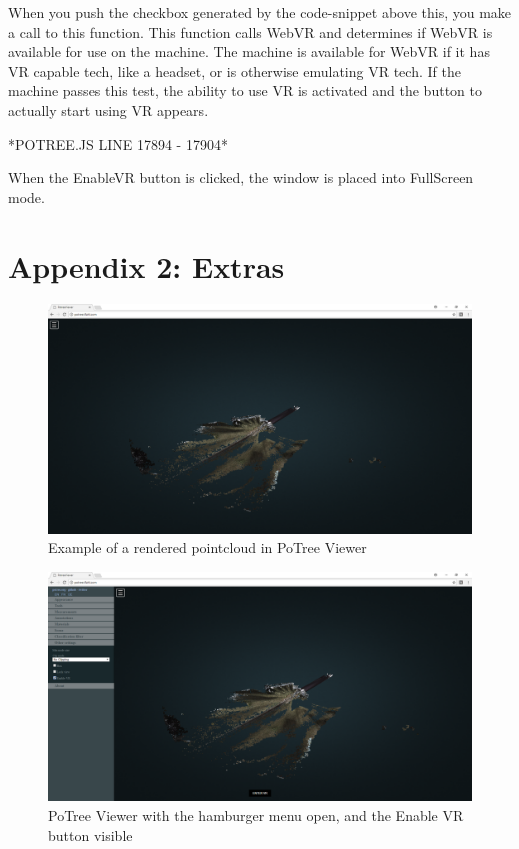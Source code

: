 \documentclass[draftclsnofoot,onecolumn]{IEEEtran}
\begin{document}
When you push the checkbox generated by the code-snippet above this, you make a call to this function.
This function calls WebVR and determines if WebVR is available for use on the machine.
The machine is available for WebVR if it has VR capable tech, like a headset, or is otherwise emulating VR tech.
If the machine passes this test, the ability to use VR is activated and the button to actually start using VR appears.

*POTREE.JS LINE 17894 - 17904*

When the EnableVR button is clicked, the window is placed into FullScreen mode.

\section{Appendix 2: Extras}

\begin{figure}[h]
    \centering
    \includegraphics[scale=.25]{NoctVR1}
	\caption{Example of a rendered pointcloud in PoTree Viewer}
\end{figure}

\begin{figure}[h]
    \includegraphics[scale=.25]{NoctVR2}
	\centering
	\caption{PoTree Viewer with the hamburger menu open, and the Enable VR button visible}
\end{figure}
\end{document}
